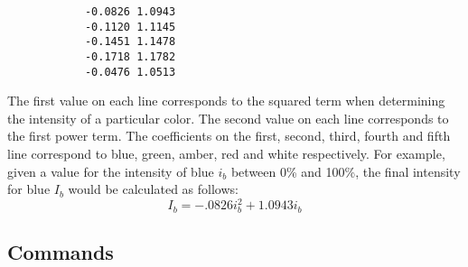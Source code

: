 \documentclass[twoside]{article}
\begin{document}
\begin{enumerate}
		\begin{verbatim}
			-0.0826	1.0943
			-0.1120	1.1145
			-0.1451	1.1478
			-0.1718	1.1782
			-0.0476	1.0513
		\end{verbatim}
		
		The first value on each line corresponds to the squared term when determining the intensity of a particular color. The second value on each line corresponds to the first power term. The coefficients on the first, second, third, fourth and fifth line correspond to blue, green, amber, red and white respectively. For example, given a value for the intensity of blue $i_b$ between 0\% and 100\%, the final intensity for blue $I_b$ would be calculated as follows:
		\[I_b = -.0826i_b^2+1.0943i_b\]
	\end{enumerate}

	
	

	
	\subsection{Commands}
	
\end{document}
